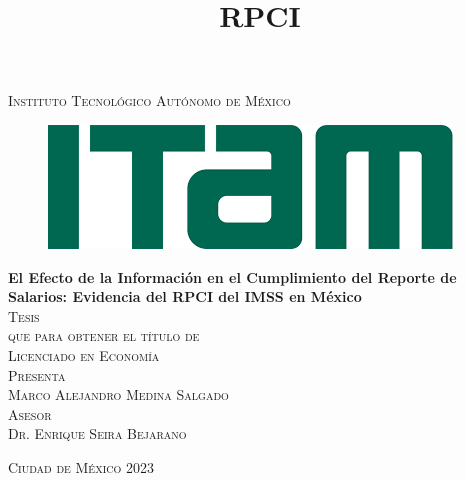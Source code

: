\documentclass[10pt, oneside]{book}
\begin{document}

\begin{titlepage}
\begin{center}

\title{RPCI}

\textsc{\Large Instituto Tecnológico Autónomo de México}\\[2em]

\begin{figure}[h]
\begin{center}
\includegraphics[scale=0.50]{04_Figures/itam_logo.png}
\end{center}
\end{figure}


\textbf{\LARGE El Efecto de la Información en el Cumplimiento del Reporte de Salarios: Evidencia del RPCI del IMSS en México}\\[2em]

\textsc{\large Tesis}\\[1em]

\textsc{\large que para obtener el título de}\\[1em]

\textsc{\LARGE Licenciado en Economía}\\[1em]

\textsc{\large Presenta}\\[1em]

\textsc{\LARGE Marco Alejandro Medina Salgado}\\[1em]

\textsc{\large Asesor}\\[1em]

\textsc{\LARGE Dr. Enrique Seira Bejarano}\\[2em]


\end{center}

\vspace*{\fill}
\textsc{Ciudad de México \hspace*{\fill} 2023}

\end{titlepage}
\end{document}

